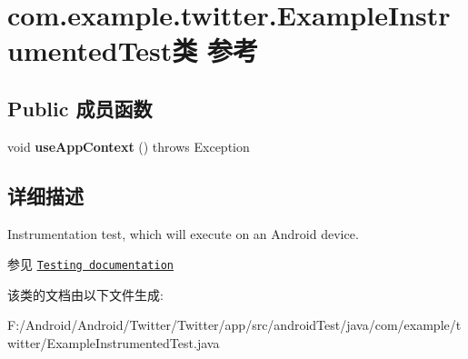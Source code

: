 \hypertarget{classcom_1_1example_1_1twitter_1_1_example_instrumented_test}{}\section{com.\+example.\+twitter.\+Example\+Instrumented\+Test类 参考}
\label{classcom_1_1example_1_1twitter_1_1_example_instrumented_test}
\subsection*{Public 成员函数}
\begin{DoxyCompactItemize}
\item 
\mbox{\label{classcom_1_1example_1_1twitter_1_1_example_instrumented_test_a7a7453a00429c19e6526394bfa11f701}} 
void {\bfseries use\+App\+Context} ()  throws Exception 
\end{DoxyCompactItemize}


\subsection{详细描述}
Instrumentation test, which will execute on an Android device.

\begin{DoxySeeAlso}{参见}
\href{http://d.android.com/tools/testing}{\tt Testing documentation} 
\end{DoxySeeAlso}


该类的文档由以下文件生成\+:\begin{DoxyCompactItemize}
\item 
F\+:/\+Android/\+Android/\+Twitter/\+Twitter/app/src/android\+Test/java/com/example/twitter/Example\+Instrumented\+Test.\+java\end{DoxyCompactItemize}
